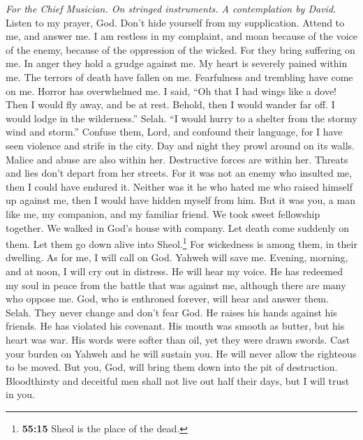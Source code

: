 \emph{For the Chief Musician. On stringed instruments. A contemplation
by David.}\\
 Listen to my prayer, God. Don't hide yourself from my
supplication.  Attend to me, and answer me. I am restless
in my complaint, and moan  because of the voice of the
enemy, because of the oppression of the wicked. For they bring suffering
on me. In anger they hold a grudge against me.  My heart
is severely pained within me. The terrors of death have fallen on me.
 Fearfulness and trembling have come on me. Horror has
overwhelmed me.  I said, ``Oh that I had wings like a
dove! Then I would fly away, and be at rest.  Behold, then
I would wander far off. I would lodge in the wilderness.'' Selah.
 ``I would hurry to a shelter from the stormy wind and
storm.''  Confuse them, Lord, and confound their language,
for I have seen violence and strife in the city.  Day and
night they prowl around on its walls. Malice and abuse are also within
her.  Destructive forces are within her. Threats and lies
don't depart from her streets.  For it was not an enemy
who insulted me, then I could have endured it. Neither was it he who
hated me who raised himself up against me, then I would have hidden
myself from him.  But it was you, a man like me, my
companion, and my familiar friend.  We took sweet
fellowship together. We walked in God's house with company.
 Let death come suddenly on them. Let them go down alive
into Sheol.\footnote{\textbf{55:15} Sheol is the place of the dead.} For
wickedness is among them, in their dwelling.  As for me,
I will call on God. Yahweh will save me.  Evening,
morning, and at noon, I will cry out in distress. He will hear my voice.
 He has redeemed my soul in peace from the battle that
was against me, although there are many who oppose me. 
God, who is enthroned forever, will hear and answer them. Selah. They
never change and don't fear God.  He raises his hands
against his friends. He has violated his covenant.  His
mouth was smooth as butter, but his heart was war. His words were softer
than oil, yet they were drawn swords.  Cast your burden
on Yahweh and he will sustain you. He will never allow the righteous to
be moved.  But you, God, will bring them down into the
pit of destruction. Bloodthirsty and deceitful men shall not live out
half their days, but I will trust in you.

